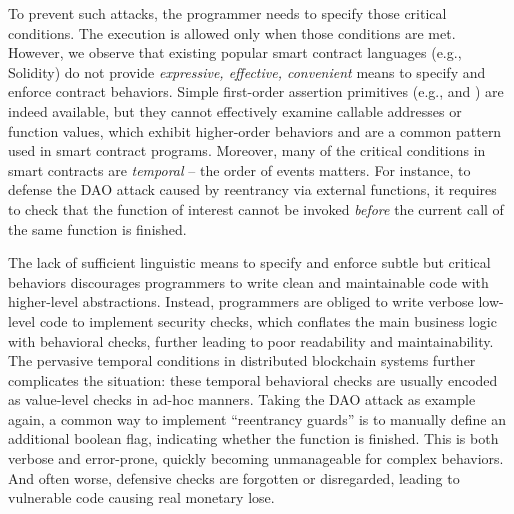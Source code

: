 

To prevent such attacks, the programmer needs to specify those critical
conditions. The execution is allowed only when those conditions are met.
However, we observe that existing popular smart contract languages (e.g.,
Solidity) do not provide \emph{expressive, effective, convenient} means to
specify and enforce contract behaviors.
Simple first-order assertion primitives (e.g.,  and )
are indeed available, but they cannot effectively examine callable addresses or
function values, which exhibit higher-order behaviors and are a common pattern
used in smart contract programs.
Moreover, many of the critical conditions in smart contracts are \emph{temporal}
-- the order of events matters.
For instance, to defense the DAO attack caused by reentrancy via
external functions, it requires to check that the function of interest cannot
be invoked \emph{before} the current call of the same function is finished.

The lack of sufficient linguistic means to specify and enforce subtle but
critical behaviors discourages programmers to write clean and maintainable
code with higher-level abstractions.
Instead, programmers are obliged to write verbose low-level code
to implement security checks, which conflates the main business logic with
behavioral checks, further leading to poor readability and maintainability.
The pervasive temporal conditions in distributed blockchain systems further
complicates the situation: these temporal behavioral checks are usually
encoded as value-level checks in ad-hoc manners.
Taking the DAO attack as example again, a common way to implement ``reentrancy
guards'' is to manually define an additional boolean flag, indicating
whether the function is finished. This is both verbose and error-prone,
quickly becoming unmanageable for complex behaviors.
And often worse, defensive checks are forgotten or disregarded, leading to
vulnerable code causing real monetary lose.

